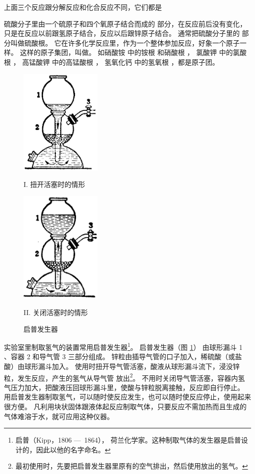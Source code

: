 上面三个反应跟分解反应和化合反应不同，它们都是%

硫酸分子里由一个硫原子和四个氧原子结合而成的  部分，在反应前后没有变化，
只是在反应以前跟氢原子结合，反应以后跟锌原子结合。
通常把硫酸分子里的  部分叫做硫酸根。
它在许多化学反应里，作为一个整体参加反应，好象一个原子一样。
这样的原子集团，叫做。
如硝酸铵  中的铵根  和硝酸根 ，
氯酸钾  中的氯酸根 ，
高锰酸钾  中的高锰酸根 ，
氢氧化钙  中的氢氧根 ，都是原子团。

\begin{figure}[htbp]
    \centering
    \begin{minipage}[b]{7cm}
        \centering
        \includegraphics[width=4cm]{../pic/czhx1-ch2-3-1}
        \caption*{I. 扭开活塞时的情形}
    \end{minipage}
    \qquad
    \begin{minipage}[b]{7cm}
        \centering
        \includegraphics[width=4cm]{../pic/czhx1-ch2-3-2}
        \caption*{II. 关闭活塞时的情形}
    \end{minipage}
    \caption{启普发生器}\label{fig:2-3}
\end{figure}

实验室里制取氢气的装置常用启普发生器\footnote{启普（Kipp，1806 —\, 1864），
荷兰化学家。这种制取气体的发生器是启普设计的，因此以他的名字命名。}。
启普发生器（图 \ref{fig:2-3}） 由球形漏斗 1 、容器 2 和导气管 3 三部分组成。
锌粒由插导气管的口子加入，稀硫酸（或盐酸）由球形漏斗加入。
使用时扭开导气管活塞，酸液从球形漏斗流下，浸没锌粒，发生反应，产生的氢气从导气管
放出\footnote{最初使用时，先要把启普发生器里原有的空气排出，然后使用放出的氢气。}。
不用时关闭导气管活塞，容器内氢气压力加大，把酸液压回球形漏斗里，使酸与锌粒脱离接触，反应即自行停止。
用启普发生器制取氢气，可以随时使反应发生，也可以随时使反应停止，使用起来很方便。
凡利用块状固体跟液体起反应制取气体，只要反应不需加热而且生成的气体难溶于水，就可应用这种仪器。


